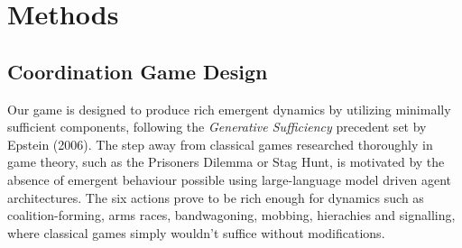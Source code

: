 \setcounter{chapter}{2}
\chapter{Methods}
\label{Methods}

%

\section{Coordination Game Design}

Our game is designed to produce rich emergent dynamics by utilizing minimally sufficient components, following the \textit{Generative Sufficiency} precedent set by Epstein (2006). The step away from classical games researched thoroughly in game theory, such as the Prisoners Dilemma or Stag Hunt, is motivated by the absence of emergent behaviour possible using large-language model driven agent architectures. The six actions prove to be rich enough for dynamics such as coalition-forming, arms races, bandwagoning, mobbing, hierachies and signalling, where classical games simply wouldn't suffice without modifications. 


